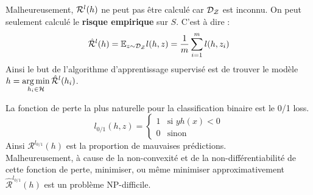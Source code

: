 


Malheureusement, $\mathcal{R}^l(h)$ ne peut pas être calculé car $\mathcal{D_Z}$ est inconnu. On peut seulement calculé le \textbf{risque empirique} sur $S$. C'est à dire :
$$ \hat{\mathcal{R}}^l(h) = \mathbb{E}_{z \sim \mathcal{D_Z}} l(h, z) = \frac{1}{m} \sum_{i = 1}^{m} l(h, z_i) $$
Ainsi le but de l'algorithme d'apprentissage supervisé est de trouver le modèle $\displaystyle h = \operatorname*{arg\,min}_{h_i \in \mathcal{H}} \hat{\mathcal{R}}^l(h_i)$.

\exe
La fonction de perte la plus naturelle pour la classification binaire est le 0/1 loss.
$$ l_{0/1}(h, z) = \left\{ \begin{array}{ll}
	1 & \text{si } yh(x) < 0 \\
	0 & \text{sinon}
\end{array}
\right. $$
Ainsi $\mathcal{R}^{l_{0/1}}(h)$ est la proportion de mauvaises prédictions. \\
Malheureusement, à cause de la non-convexité et de la non-différentiabilité de cette fonction de perte, minimiser, ou même minimiser approximativement $\mathcal{\hat{R}}^{l_{0/1}}(h)$ est un problème NP-difficile.

